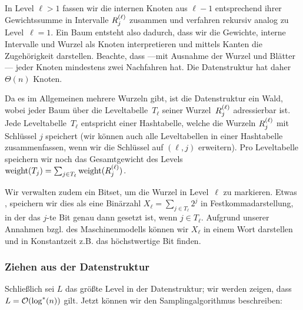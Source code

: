 In Level $\ell > 1$ fassen wir die internen Knoten aus $\ell - 1$ entsprechend ihrer Gewichtssumme in Intervalle $R^{(\ell)}_{j}$ zusammen und verfahren rekursiv analog zu Level~$\ell = 1$.
Ein Baum entsteht also dadurch, dass wir die Gewichte, interne Intervalle und Wurzel als Knoten interpretieren und mittels Kanten die Zugehörigkeit darstellen.
Beachte, dass ---mit Ausnahme der Wurzel und Blätter--- jeder Knoten mindestens zwei Nachfahren hat.
Die Datenstruktur hat daher $\Theta(n)$ Knoten.

Da  es im Allgemeinen mehrere Wurzeln gibt, ist die Datenstruktur ein Wald, wobei jeder Baum über die Leveltabelle~$T_\ell$ seiner Wurzel~$R^{(\ell)}_{j}$ adressierbar ist.
Jede Leveltabelle~$T_\ell$ entspricht einer Hashtabelle, welche die Wurzeln $R^{(\ell)}_{j}$ mit Schlüssel $j$ speichert (wir können auch alle Leveltabellen in einer Hashtabelle zusammenfassen, wenn wir die Schlüssel auf $(\ell, j)$ erweitern).
Pro Leveltabelle speichern wir noch das Gesamtgewicht des Levels $\mathrm{weight}(T_j) = \sum_{j \in T_\ell} \mathrm{weight}(R^{(\ell)}_{j})$.

Wir verwalten zudem ein Bitset, um die Wurzel in Level~$\ell$ zu markieren.
Etwas , speichern wir dies als eine Binärzahl $X_\ell = \sum_{j \in T_\ell} 2^j$ in Festkommadarstellung, in der das $j$-te Bit genau dann gesetzt ist, wenn $j \in T_\ell$.
Aufgrund unserer Annahmen bzgl. des Maschinenmodells können wir $X_\ell$ in einem Wort darstellen und in Konstantzeit z.B. das höchstwertige Bit finden.

\subsubsection{Ziehen aus der Datenstruktur}
Schließlich sei $L$ das größte Level in der Datenstruktur; wir werden zeigen, dass $L = \mathcal{O}\!\left(\log^* (n)\right)$ gilt.
Jetzt  können wir den Samplingalgorithmus beschreiben:

